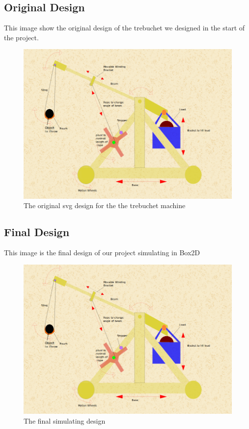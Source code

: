\documentclass[11pt]{article}
\begin{document}
\subsection{Original Design}
This image show the original design of the trebuchet we designed in the start of the project\cite{odurl}.
\begin{figure}[!ht]
\centering
\includegraphics[scale=0.5]{lab1}
\caption{The original svg design for the the trebuchet machine}
\label{fig1}
\end{figure}
\newpage
\subsection{Final Design}
This image is the final design of our project simulating in Box2D
\begin{figure}[!ht]
\centering
\includegraphics[scale=0.5]{lab1}
\caption{The final simulating design }
\label{fig2}
\end{figure}
\end{document}
